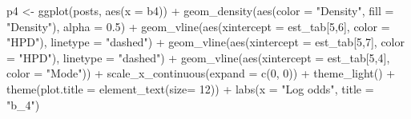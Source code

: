\documentclass[12pt]{article}
\newenvironment{Shaded}{\begin{snugshade}}{\end{snugshade}}
\newcommand{\AttributeTok}[1]{\textcolor[rgb]{0.77,0.63,0.00}{#1}}
\newcommand{\DecValTok}[1]{\textcolor[rgb]{0.00,0.00,0.81}{#1}}
\newcommand{\FloatTok}[1]{\textcolor[rgb]{0.00,0.00,0.81}{#1}}
\newcommand{\FunctionTok}[1]{\textcolor[rgb]{0.00,0.00,0.00}{#1}}
\newcommand{\NormalTok}[1]{#1}
\newcommand{\OtherTok}[1]{\textcolor[rgb]{0.56,0.35,0.01}{#1}}
\newcommand{\SpecialCharTok}[1]{\textcolor[rgb]{0.00,0.00,0.00}{#1}}
\newcommand{\StringTok}[1]{\textcolor[rgb]{0.31,0.60,0.02}{#1}}
\begin{document}
\begin{Shaded}
\begin{Highlighting}[]
\NormalTok{p4 }\OtherTok{\textless{}{-}} \FunctionTok{ggplot}\NormalTok{(posts, }\FunctionTok{aes}\NormalTok{(}\AttributeTok{x =}\NormalTok{ b4)) }\SpecialCharTok{+}
  \FunctionTok{geom\_density}\NormalTok{(}\FunctionTok{aes}\NormalTok{(}\AttributeTok{color =} \StringTok{"Density"}\NormalTok{, }\AttributeTok{fill =} \StringTok{"Density"}\NormalTok{), }\AttributeTok{alpha =} \FloatTok{0.5}\NormalTok{) }\SpecialCharTok{+}
  \FunctionTok{geom\_vline}\NormalTok{(}\FunctionTok{aes}\NormalTok{(}\AttributeTok{xintercept =}\NormalTok{ est\_tab[}\DecValTok{5}\NormalTok{,}\DecValTok{6}\NormalTok{], }\AttributeTok{color =} \StringTok{"HPD"}\NormalTok{), }\AttributeTok{linetype =} \StringTok{"dashed"}\NormalTok{) }\SpecialCharTok{+}
  \FunctionTok{geom\_vline}\NormalTok{(}\FunctionTok{aes}\NormalTok{(}\AttributeTok{xintercept =}\NormalTok{ est\_tab[}\DecValTok{5}\NormalTok{,}\DecValTok{7}\NormalTok{], }\AttributeTok{color =} \StringTok{"HPD"}\NormalTok{), }\AttributeTok{linetype =} \StringTok{"dashed"}\NormalTok{) }\SpecialCharTok{+}
  \FunctionTok{geom\_vline}\NormalTok{(}\FunctionTok{aes}\NormalTok{(}\AttributeTok{xintercept =}\NormalTok{ est\_tab[}\DecValTok{5}\NormalTok{,}\DecValTok{4}\NormalTok{], }\AttributeTok{color =} \StringTok{"Mode"}\NormalTok{)) }\SpecialCharTok{+}
  \FunctionTok{scale\_x\_continuous}\NormalTok{(}\AttributeTok{expand =} \FunctionTok{c}\NormalTok{(}\DecValTok{0}\NormalTok{, }\DecValTok{0}\NormalTok{)) }\SpecialCharTok{+}
  \FunctionTok{theme\_light}\NormalTok{() }\SpecialCharTok{+}
  \FunctionTok{theme}\NormalTok{(}\AttributeTok{plot.title =} \FunctionTok{element\_text}\NormalTok{(}\AttributeTok{size=} \DecValTok{12}\NormalTok{)) }\SpecialCharTok{+} 
  \FunctionTok{labs}\NormalTok{(}\AttributeTok{x =} \StringTok{"Log odds"}\NormalTok{,}
       \AttributeTok{title =} \StringTok{"b\_4"}\NormalTok{)}


\end{Highlighting}
\end{Shaded}
\end{document}
